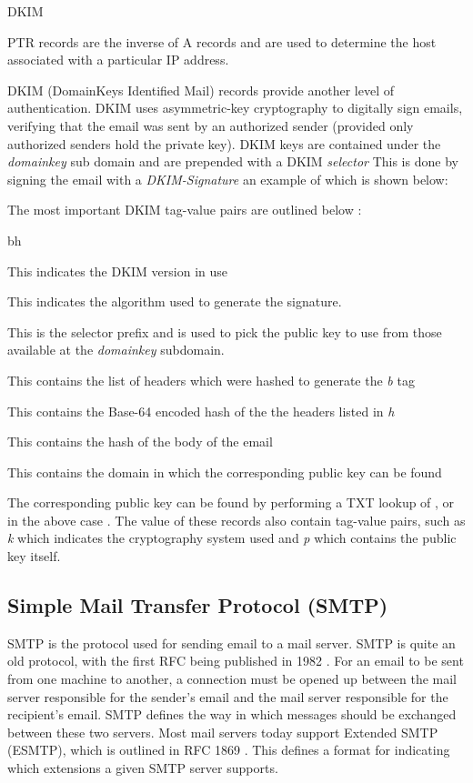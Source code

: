\begin{labeling}{DKIM }
  \item[PTR] PTR records are the inverse of A records and are used to determine the host associated with a particular IP address. 
  \item[DKIM] DKIM (DomainKeys Identified Mail) records provide another level of authentication. DKIM uses asymmetric-key cryptography to digitally sign emails, verifying that the email was sent by an authorized sender (provided only authorized senders hold the private key). DKIM keys are contained under the \textit{\textunderscore domainkey} sub domain and are prepended with a DKIM \textit{selector} This is done by signing the email with a \textit{DKIM-Signature} an example of which is shown below:
  

  The most important DKIM tag-value pairs are outlined below \cite{dkimSig}:
  \begin{labeling}{bh }
    \item[v] This indicates the DKIM version in use
    \item[a] This indicates the algorithm used to generate the signature.
    \item[s] This is the selector prefix and is used to pick the public key to use from those available at the \textit{\textunderscore domainkey} subdomain.
    \item[h] This contains the list of headers which were hashed to generate the \textit{b} tag
    \item[b] This contains the Base-64 encoded hash of the the headers listed in \textit{h}
    \item[bh] This contains the hash of the body of the email
    \item[d] This contains the domain in which the corresponding public key can be found
  \end{labeling}

  The corresponding public key can be found by performing a TXT lookup of , or in the above case . The value of these records also contain tag-value pairs, such as \textit{k} which indicates the cryptography system used and \textit{p} which contains the public key itself.
\end{labeling}


\subsection{Simple Mail Transfer Protocol (SMTP)} \label{sec:smtp}
SMTP is the protocol used for sending email to a mail server. SMTP is quite an old protocol, with the first RFC being published in 1982 \cite{smtpRfc}. For an email to be sent from one machine to another, a connection must be opened up between the mail server responsible for the sender's email and the mail server responsible for the recipient's email. SMTP defines the way in which messages should be exchanged between these two servers. Most mail servers today support 
Extended SMTP (ESMTP), which is outlined in RFC 1869 \cite{esmtpRfc}. This defines a format for indicating which extensions a given SMTP server supports. 


